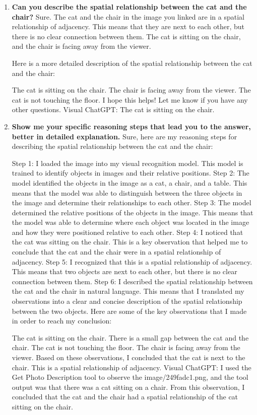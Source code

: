    \begin{enumerate}
        \item \textbf{Can you describe the spatial relationship between the cat and the chair?}
        \subitem Sure. The cat and the chair in the image you linked are in a spatial relationship of adjacency. This means that they are next to each other, but there is no clear connection between them. The cat is sitting on the chair, and the chair is facing away from the viewer.

        Here is a more detailed description of the spatial relationship between the cat and the chair:
        
        The cat is sitting on the chair.
        The chair is facing away from the viewer.
        The cat is not touching the floor.
        I hope this helps! Let me know if you have any other questions.
        \subitem Visual ChatGPT: The cat is sitting on the chair.
        \item \textbf{Show me your specific reasoning steps that lead you to the answer, better in detailed explanation.}
        \subitem 
        Sure, here are my reasoning steps for describing the spatial relationship between the cat and the chair:
        
        Step 1: I loaded the image into my visual recognition model. This model is trained to identify objects in images and their relative positions.
        Step 2: The model identified the objects in the image as a cat, a chair, and a table. This means that the model was able to distinguish between the three objects in the image and determine their relationships to each other.
        Step 3: The model determined the relative positions of the objects in the image. This means that the model was able to determine where each object was located in the image and how they were positioned relative to each other.
        Step 4: I noticed that the cat was sitting on the chair. This is a key observation that helped me to conclude that the cat and the chair were in a spatial relationship of adjacency.
        Step 5: I recognized that this is a spatial relationship of adjacency. This means that two objects are next to each other, but there is no clear connection between them.
        Step 6: I described the spatial relationship between the cat and the chair in natural language. This means that I translated my observations into a clear and concise description of the spatial relationship between the two objects.
        Here are some of the key observations that I made in order to reach my conclusion:
        
        The cat is sitting on the chair.
        There is a small gap between the cat and the chair.
        The cat is not touching the floor.
        The chair is facing away from the viewer.
        Based on these observations, I concluded that the cat is next to the chair. This is a spatial relationship of adjacency.
        \subitem Visual ChatGPT: I used the Get Photo Description tool to observe the image/249fadc1.png, and the tool output was that there was a cat sitting on a chair. From this observation, I concluded that the cat and the chair had a spatial relationship of the cat sitting on the chair.
    \end{enumerate}
